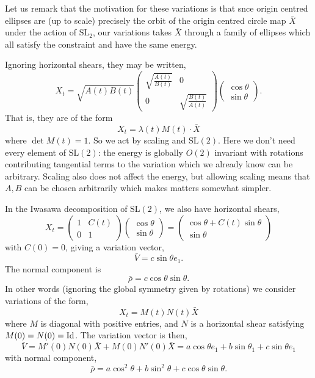 \documentclass[12pt]{article}
\begin{document}
Let us remark that the motivation for these variations is that snce origin centred ellipses are (up to scale) precisely the orbit of the origin centred circle map \(\bar{X}\) under the action of \(\text{SL}_2\), our variations takes \(\bar{X}\) through a family of ellipses which all satisfy the constraint and have the same energy.

Ignoring horizontal shears, they may be written,
\[
X_t = \sqrt{A(t) B(t)}
\begin{pmatrix}
\sqrt{\frac{A(t)}{B(t)}} & 0 \\
0 & \sqrt{\frac{B(t)}{A(t)}}
\end{pmatrix}
\begin{pmatrix}
\cos \theta \\
\sin \theta
\end{pmatrix}.
\]
That is, they are of the form
\[
X_t = \lambda(t) M(t) \cdot \bar{X}
\]
where \(\det M(t) = 1\). So we act by scaling and \(\text{SL}(2)\). Here we don't need every element of \(\text{SL}(2)\): the energy is globally \(O(2)\) invariant with rotations contributing tangential terms to the variation which we already know can be arbitrary. Scaling also does not affect the energy, but allowing scaling means that \(A, B\) can be chosen arbitrarily which makes matters somewhat simpler.

In the Iwasawa decomposition of \(\text{SL}(2)\), we also have horizontal shears,
\[
X_t = 
\begin{pmatrix}
1 & C(t) \\
0 & 1
\end{pmatrix}
\begin{pmatrix}
\cos \theta \\
\sin \theta
\end{pmatrix}
=
\begin{pmatrix}
\cos\theta + C(t) \sin\theta \\
\sin\theta
\end{pmatrix}
\]
with \(C(0) = 0\), giving a variation vector,
\[
\bar{V} = c \sin\theta e_1.
\]
The normal component is
\[
\bar{\rho} = c \cos\theta \sin\theta.
\]
In other words (ignoring the global symmetry given by rotations) we consider variations of the form,
\[
X_t = M(t) N(t) \bar{X}
\]
where \(M\) is diagonal with positive entries, and \(N\) is a horizontal shear satisfying \(M(0) = N(0) = \operatorname{Id}\). The variation vector is then,
\[
\bar{V} = M'(0) N(0) \bar{X} + M(0) N'(0) \bar{X} = a \cos\theta e_1 + b \sin\theta_1 + c \sin\theta e_1
\]
with normal component,
\[
\bar{\rho} = a \cos^2\theta + b \sin^2 \theta + c \cos\theta \sin\theta.
\]
\end{document}
